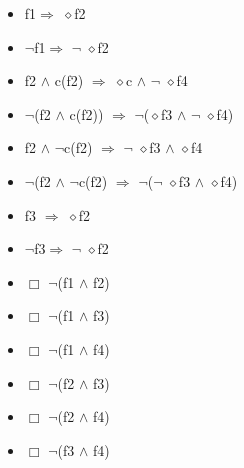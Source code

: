 \documentclass[a4paper, 11pt]{article}
\begin{document}
\begin{itemize}
\begin{itemize}
			\item f1$\Rightarrow$ $\diamond$f2
			\item $\neg$f1$\Rightarrow$ $\neg$ $\diamond$f2
			\item f2  $\wedge$  c(f2) $\Rightarrow$ $\diamond$c $\wedge$  $\neg$ $\diamond$f4
			\item $\neg$(f2  $\wedge$  c(f2)) $\Rightarrow$ $\neg$($\diamond$f3 $\wedge$  $\neg$ $\diamond$f4)
			\item f2  $\wedge$  $\neg$c(f2) $\Rightarrow$ $\neg$ $\diamond$f3  $\wedge$  $\diamond$f4
			\item $\neg$(f2  $\wedge$  $\neg$c(f2) $\Rightarrow$ $\neg$($\neg$ $\diamond$f3 $\wedge$  $\diamond$f4)
			\item f3 $\Rightarrow$ $\diamond$f2
			\item $\neg$f3$\Rightarrow$ $\neg$ $\diamond$f2
			\item $\Box$ $\neg$(f1  $\wedge$  f2)
			\item $\Box$ $\neg$(f1  $\wedge$  f3)
			\item $\Box$ $\neg$(f1  $\wedge$  f4)
			\item $\Box$ $\neg$(f2  $\wedge$  f3)
			\item $\Box$ $\neg$(f2  $\wedge$  f4)
			\item $\Box$ $\neg$(f3  $\wedge$  f4) 
		\end{itemize}
	\end{itemize}	
	
\end{document}
